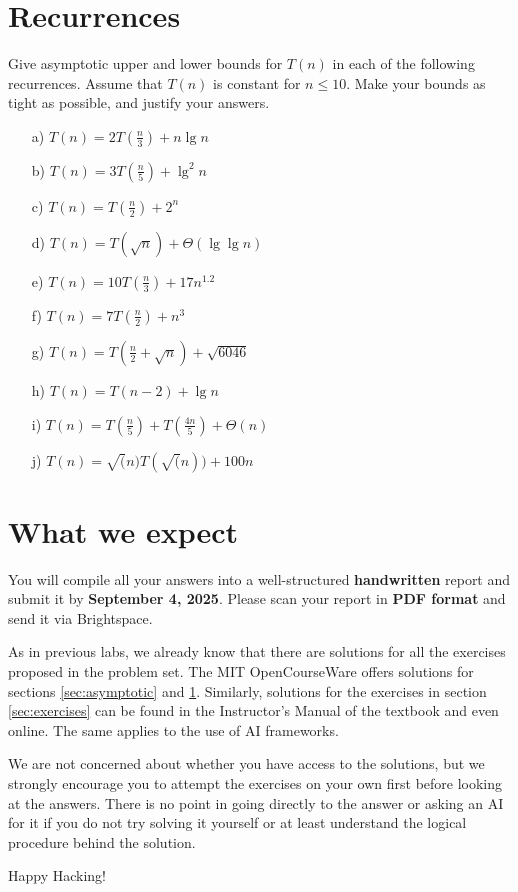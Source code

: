 \documentclass[12pt]{article}
\begin{document}
\section{Recurrences}\label{sec:recurrences}
Give asymptotic upper and lower bounds for $T(n)$ in each of the following recurrences. Assume that $T(n)$ is constant for $n \leq 10$. Make your bounds as tight as possible, and justify your answers.

\begin{enumerate}
    \item[a)] $T(n) = 2T(\frac{n}{3}) + n \lg n$
    \item[b)] $T(n) = 3T(\frac{n}{5}) + \lg^2 n$
    \item[c)] $T(n) =  T(\frac{n}{2}) + 2^n$
    \item[d)] $T(n) =  T(\sqrt{n}) + \Theta(\lg \lg n)$
    \item[e)] $T(n) = 10T(\frac{n}{3}) + 17n^{1.2}$
    \item[f)] $T(n) = 7T(\frac{n}{2}) + n^3$
    \item[g)] $T(n) =  T(\frac{n}{2} + \sqrt{n}) + \sqrt{6046}$
    \item[h)] $T(n) =  T(n - 2) + \lg n$
    \item[i)] $T(n) =  T(\frac{n}{5}) + T(\frac{4n}{5}) + \Theta(n)$
    \item[j)] $T(n) = \sqrt(n)T(\sqrt(n)) + 100n$
\end{enumerate}

\section{What we expect}
You will compile all your answers into a well-structured \textbf{\large handwritten} report and submit it by \textbf{September 4, 2025}. Please scan your report in \textbf{PDF format} and send it via Brightspace.

As in previous labs, we already know that there are solutions for all the exercises proposed in the problem set. The MIT OpenCourseWare offers solutions for sections \ref{sec:asymptotic} and \ref{sec:recurrences}. Similarly, solutions for the exercises in section \ref{sec:exercises} can be found in the Instructor's Manual of the textbook and even online. The same applies to the use of AI frameworks.

We are not concerned about whether you have access to the solutions, but we strongly encourage you to attempt the exercises on your own first before looking at the answers. There is no point in going directly to the answer or asking an AI for it if you do not try solving it yourself or at least understand the logical procedure behind the solution.

\vspace{5mm}
Happy Hacking! 
\end{document}
